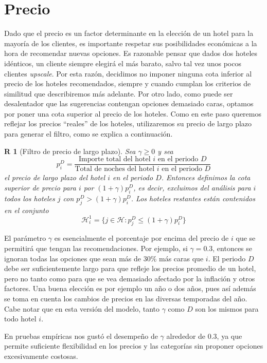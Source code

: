 \documentclass[12pt]{report}
\newcommand{\HH}{\mathcal{H}}
\newtheorem{regla}{R}%
\begin{document}
\section{Precio}

Dado que el precio es un factor determinante en la elección de un hotel para la mayoría de los clientes, es importante respetar sus posibilidades económicas a la hora de recomendar nuevas opciones. Es razonable pensar que dados dos hoteles idénticos, un cliente siempre elegirá el más barato, salvo tal vez unos pocos clientes \emph{upscale}. Por esta razón, decidimos no imponer ninguna cota inferior al precio de los hoteles recomendados, siempre y cuando cumplan los criterios de similitud que describiremos más adelante. Por otro lado, como puede ser desalentador que las sugerencias contengan opciones demasiado caras, optamos por poner una cota superior al precio de los hoteles. Como en este paso queremos reflejar los precios ``reales'' de los hoteles, utilizaremos su precio de largo plazo para generar el filtro, como se explica a continuación.
\begin{regla}[Filtro de precio de largo plazo] \label{r:preciolargo}
Sea $\gamma \geq 0$ y sea
\[
p^D_i = \frac{\text{Importe total del hotel $i$ en el periodo $D$}}{\text{Total de noches del hotel $i$ en el periodo $D$}}
\]
el precio de largo plazo del hotel $i$ en el periodo $D$. Entonces definimos la cota superior de precio para $i$ por $(1 + \gamma)p^D_i$, es decir, excluimos del análisis para $i$ todos los hoteles $j$ con $p^D_j > (1 + \gamma)p^D_i$. Los hoteles restantes están contenidos en el conjunto
\[
\HH_i^1 = \{j \in \HH : p^D_j \leq (1 + \gamma)p^D_i\}
\]
\end{regla}
El parámetro $\gamma$ es esencialmente el porcentaje por encima del precio de $i$ que se permitirá que tengan las recomendaciones. Por ejemplo, si $\gamma = 0.3$, entonces se ignoran todas las opciones que sean más de 30\% más caras que $i$. El periodo $D$ debe ser suficientemente largo para que refleje los precios promedio de un hotel, pero no tanto como para que se vea demasiado afectado por la inflación y otros factores. Una buena elección es por ejemplo un año o dos años, pues así además se toma en cuenta los cambios de precios en las diversas temporadas del año. Cabe notar que en esta versión del modelo, tanto $\gamma$ como $D$ son los mismos para todo hotel $i$.

En pruebas empíricas nos gustó el desempeño de $\gamma$ alrededor de 0.3, ya que permite suficiente flexibilidad en los precios y las categorías sin proponer opciones excesivamente costosas.
\end{document}
